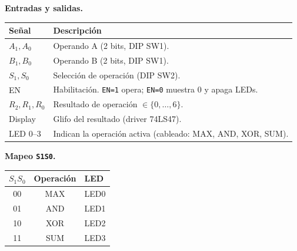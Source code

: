\documentclass[a4paper,10pt]{article}
\begin{document}
\begin{minipage}[t]{0.55\textwidth}
\begin{center}
  \end{center}
\end{minipage}%
\hfill
\begin{minipage}[t]{0.43\textwidth}
  \textbf{Entradas y salidas.}
  \vspace{2pt}
  \footnotesize
  \begin{tabularx}{\linewidth}{l X}
    \toprule
    \textbf{Se\~{n}al} & \textbf{Descripci\'{o}n}\\
    \midrule
    $A_1,A_0$ & Operando A (2 bits, DIP SW1).\\
    $B_1,B_0$ & Operando B (2 bits, DIP SW1).\\
    $S_1,S_0$ & Selecci\'{o}n de operaci\'{o}n (DIP SW2).\\
    EN        & Habilitaci\'{o}n. \texttt{EN=1} opera; \texttt{EN=0} muestra 0 y apaga LEDs.\\
    $R_2,R_1,R_0$ & Resultado de operaci\'{o}n $\in \{0,\dots,6\}$.\\
    Display   & Glifo del resultado (driver 74LS47).\\
    LED 0--3  & Indican la operaci\'{o}n activa (cableado: MAX, AND, XOR, SUM).\\
    \bottomrule
  \end{tabularx}

  \vspace{4pt}
  \textbf{Mapeo \texttt{S1S0}.}
  \vspace{2pt}
  \begin{tabular}{cc|l}
    \toprule
    $S_1S_0$ & Operaci\'{o}n & LED\\
    \midrule
    00 & MAX & LED0\\
    01 & AND & LED1\\
    10 & XOR & LED2\\
    11 & SUM & LED3\\
    \bottomrule
  \end{tabular}
\end{minipage}
\end{document}
